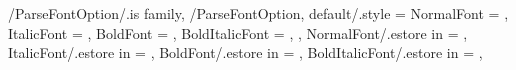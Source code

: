 %
%
%
%
%





\newcommand{\VarFontTypeTimesKaiu}{0}


\def \VarFontTypeNotoSansCJKEngFileNameNormal {NotoSansCJKtc-Medium.otf}
\def \VarFontTypeNotoSansCJKEngFileNameBold {NotoSansCJKtc-Bold.otf}
\def \VarFontTypeNotoSansCJKChiFileNameNormal {NotoSansCJKtc-Medium.otf}
\def \VarFontTypeNotoSansCJKChiFileNameBold {NotoSansCJKtc-Bold.otf}

\newcommand{\VarFontTypeNotoSansCJK}{1}



\pgfkeys
{
  /ParseFontOption/.is family, /ParseFontOption,
  default/.style =
  {
    NormalFont = \empty,
    ItalicFont = \empty,
    BoldFont = \empty,
    BoldItalicFont = \empty,
  },
  NormalFont/.estore in = \TmpValueNormalFont,
  ItalicFont/.estore in = \TmpValueItalicFont,
  BoldFont/.estore in = \TmpValueBoldFont,
  BoldItalicFont/.estore in = \TmpValueBoldItalicFont,
} %


\newcommand*\FontDirPath{./template/fonts/} %

\newcommand{\SetEngMainFont}[2][\empty]
{%
  \pgfkeys{/ParseFontOption, default, #1}%
  \defaultfontfeatures[#2]{%
    Path = \FontDirPath,
    UprightFont = \TmpValueNormalFont
  }%
  \ifthenelse{\equal{\TmpValueItalicFont}{\empty}}{}{%
    \defaultfontfeatures+[#2]{%
      ItalicFont = \TmpValueItalicFont}}%
  \ifthenelse{\equal{\TmpValueBoldFont}{\empty}}{}{%
    \defaultfontfeatures+[#2]{%
      BoldFont = \TmpValueBoldFont}}%
  \ifthenelse{\equal{\TmpValueBoldItalicFont}{\empty}}{}{%
    \defaultfontfeatures+[#2]{%
      BoldItalicFont = \TmpValueBoldItalicFont}}%
  \setmainfont{#2}
} %


